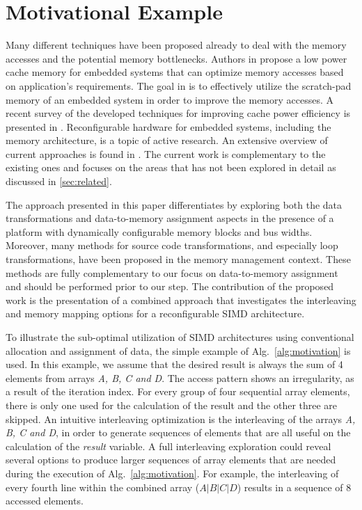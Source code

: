 \documentclass[prodmode,acmtecs]{acmsmall}
\begin{document}
\section{Motivational Example}
\label{sec:motivational}
%
Many different techniques have been proposed already to deal with the memory accesses and the potential memory bottlenecks. 
Authors in \cite{malik2000low} propose a low power cache memory for embedded systems that can optimize memory accesses based on application's requirements.
The goal in \cite{guo2013data} is to effectively utilize the scratch-pad memory of an embedded system in order to improve the memory accesses.
A recent survey of the developed techniques for improving cache power efficiency is presented in \cite{mittal2014survey}.
Reconfigurable hardware for embedded systems, including the memory architecture, is a topic of active research. 
An extensive overview of current approaches is found in \cite{Garcia}. 
The current work is complementary to the existing ones and focuses on the areas that has not been explored in detail as discussed in \ref{sec:related}.

The approach presented in this paper differentiates by exploring both the data transformations and data-to-memory assignment aspects in the presence of a platform with dynamically configurable memory blocks and bus widths. 
Moreover, many methods for source code transformations, and especially loop transformations, have been proposed in the memory management context. 
These methods are fully complementary to our focus on data-to-memory assignment and should be performed prior to our step.
The contribution of the proposed work is the presentation of a combined approach that investigates the interleaving and memory mapping options for a reconfigurable SIMD architecture.  

To illustrate the sub-optimal utilization of SIMD architectures using conventional allocation and assignment of data, the simple example of Alg.~\ref{alg:motivation} is used.
In this example, we assume that the desired result is always the sum of 4 elements from arrays \textit{A, B, C and D}. 
The access pattern shows an irregularity, as a result of the iteration index.
For every group of four sequential array elements, there is only one used for the calculation of the result and the other three are skipped.
An intuitive interleaving optimization is the interleaving of the arrays \textit{A, B, C and D}, in order to generate sequences of elements that are all useful on the calculation of the \textit{result} variable. 
A full interleaving exploration could reveal several options to produce larger sequences of array elements that are needed during the execution of Alg.~\ref{alg:motivation}.
For example, the interleaving of every fourth line within the combined array ($A\vert B\vert C\vert D$) results in a sequence of 8 accessed elements.
\end{document}
